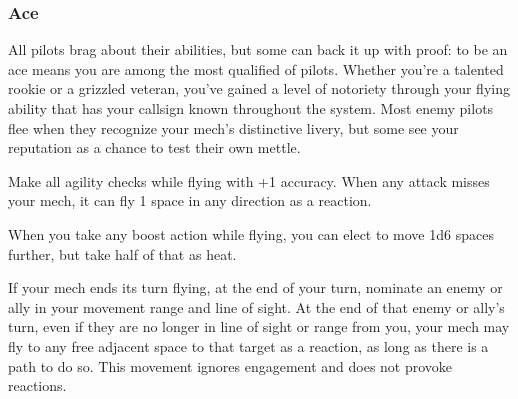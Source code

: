 \subsubsection{Ace}

\begin{talent}
{All pilots brag about their abilities, but some can back it up with proof: to be an ace means you are among
the most qualified of pilots. Whether you're a talented rookie or a grizzled veteran, you've gained a level of
notoriety through your flying ability that has your callsign known throughout the system. Most enemy pilots
flee when they recognize your mech's distinctive livery, but some see your reputation as a chance to test
their own mettle.}

Make all agility checks while flying with +1 accuracy. When any attack
misses your mech, it can fly 1 space in any direction as a reaction.

When you take any boost action while flying, you can elect to move 1d6
spaces further, but take half of that as heat.

If your mech ends its turn flying, at the end of your turn, nominate an
enemy or ally in your movement range and line of sight. At the end of that enemy or ally's turn,
even if they are no longer in line of sight or range from you, your mech may fly to any free
adjacent space to that target as a reaction, as long as there is a path to do so. This movement
ignores engagement and does not provoke reactions.

\end{talent}